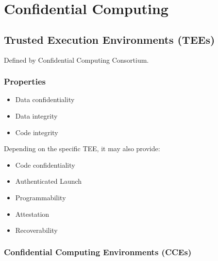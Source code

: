 

\chapter{Confidential Computing}
\label{ch:confidential-computing}

\section{Trusted Execution Environments (TEEs)}
\label{sec:TEE}

Defined by Confidential Computing Consortium.

\subsection{Properties}

\begin{itemize}
  \item Data confidentiality
  \item Data integrity
  \item Code integrity
\end{itemize}

Depending on the specific TEE, it may also provide:

\begin{itemize}
  \item Code confidentiality
  \item Authenticated Launch
  \item Programmability
  \item Attestation
  \item Recoverability
\end{itemize}

\subsection{Confidential Computing Environments (CCEs)}

